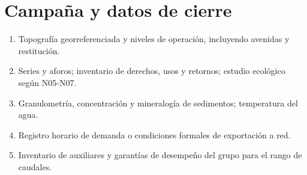 \section{Campaña y datos de cierre}
\begin{enumerate}
\item Topografía georreferenciada y niveles de operación, incluyendo avenidas y restitución.
\item Series y aforos; inventario de derechos, usos y retornos; estudio ecológico según N05-N07.
\item Granulometría, concentración y mineralogía de sedimentos; temperatura del agua.
\item Registro horario de demanda o condiciones formales de exportación a red.
\item Inventario de auxiliares y garantías de desempeño del grupo para el rango de caudales.
\end{enumerate}
